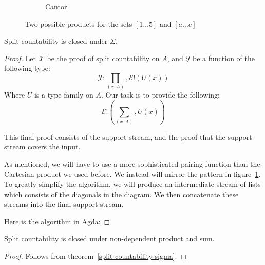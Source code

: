 \begin{refsection}
\begin{figure}
\begin{subfigure}[b]{.5\linewidth}
    \caption{Cantor}
    \label{cantor}
  \end{subfigure}
  \caption{Two possible products for the sets \(\left[ 1 \dots 5 \right]\) and
    \(\left[  a \dots e \right]\)}
  \label{pairings}
\end{figure}
\begin{theorem} \label{split-countability-sigma}
  Split countability is closed under \(\Sigma\).
\end{theorem}
\begin{proof}
  Let \(\mathcal{X}\) be the proof of split countability on \(A\), and
  \(\mathcal{Y}\) be a function of the following type:
  \begin{equation}
    \mathcal{Y} : \prod_{(x : A)} , \mathcal{E}!(U(x))
  \end{equation}
  Where \(U\) is a type family on \(A\).
  Our task is to provide the following:
  \begin{equation}
    \mathcal{E}!\left(\sum_{(x : A)} , U(x)\right)
  \end{equation}

  This final proof consists of the support stream, and the proof that the
  support stream covers the input.

  As mentioned, we will have to use a more sophisticated pairing function than
  the Cartesian product we used before.
  We instead will mirror the pattern in figure~\ref{cantor}.
  To greatly simplify the algorithm, we will produce an intermediate stream of
  lists which consists of the diagonals in the diagram.
  We then concatenate these streams into the final support stream.

  Here is the algorithm in Agda:
\end{proof}
\begin{lemma}
  Split countability is closed under non-dependent product and sum.
\end{lemma}
\begin{proof}
  Follows from theorem~\ref{split-countability-sigma}.
\end{proof}

\end{refsection}
